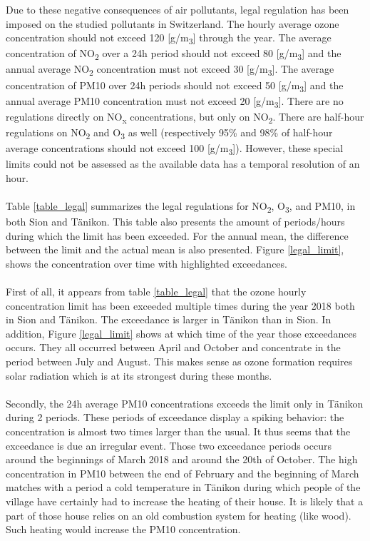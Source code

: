 \documentclass[a4paper, 12pt]{article}
\begin{document}
    Due to these negative consequences of air pollutants, legal regulation has been imposed on the studied pollutants in Switzerland. The hourly average ozone concentration should not exceed 120 [\textmu g/m\textsubscript{3}] through the year. The average concentration of NO\textsubscript{2} over a 24h period should not exceed 80 [\textmu g/m\textsubscript{3}] and the annual average NO\textsubscript{2} concentration must not exceed 30 [\textmu g/m\textsubscript{3}]. The average concentration of PM10 over 24h periods should not exceed 50 [\textmu g/m\textsubscript{3}] and the annual average PM10 concentration must not exceed 20 [\textmu g/m\textsubscript{3}]. There are no regulations directly on NO\textsubscript{x} concentrations, but only on NO\textsubscript{2}. There are half-hour regulations on NO\textsubscript{2} and O\textsubscript{3} as well (respectively 95\% and 98\% of half-hour average concentrations should not exceed 100 [\textmu g/m\textsubscript{3}]). However, these special limits could not be assessed as the available data has a temporal resolution of an hour. 
    \\
    \\
    Table \ref{table_legal} summarizes the legal regulations for NO\textsubscript{2}, O\textsubscript{3}, and PM10, in both Sion and Tänikon. This table also presents the amount of periods/hours during which the limit has been exceeded. For the annual mean, the difference between the limit and the actual mean is also presented. Figure \ref{legal_limit}, shows the concentration over time with highlighted exceedances.
    \\
    \\
    First of all, it appears from table \ref{table_legal} that the ozone hourly concentration limit has been exceeded multiple times during the year 2018 both in Sion and Tänikon. The exceedance is larger in Tänikon than in Sion. In addition, Figure \ref{legal_limit} shows at which time of the year those exceedances occurs. They all occurred between April and October and concentrate in the period between July and August. This makes sense as ozone formation requires solar radiation which is at its strongest during these months. 
    \\
    \\
    Secondly, the 24h average PM10 concentrations exceeds the limit only in Tänikon during 2 periods. These periods of exceedance display a spiking behavior: the concentration is almost two times larger than the usual. It thus seems that the exceedance is due an irregular event. Those two exceedance periods occurs around the beginnings of March 2018 and around the 20th of October. The high concentration in PM10 between the end of February and the beginning of March matches with a period a cold temperature in Tänikon during which people of the village have certainly had to increase the heating of their house. It is likely that a part of those house relies on an old combustion system for heating (like wood). Such heating would increase the PM10 concentration. \\
\end{document}
